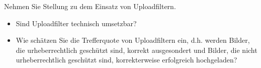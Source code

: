 \documentclass[10pt, a4paper]{scrartcl}
\begin{document}
	\begin{aufgabe}
	Nehmen Sie Stellung zu dem Einsatz von Uploadfiltern.
	
	\begin{itemize}
		\item Sind Uploadfilter technisch umsetzbar?
		\item Wie schätzen Sie die Trefferquote von Uploadfiltern ein, d.h. werden Bilder, die urheberrechtlich geschützt sind, korrekt ausgesondert und Bilder, die nicht urheberrechtlich geschützt sind, korrekterweise erfolgreich hochgeladen?
	\end{itemize}
	\end{aufgabe}
\end{document}
